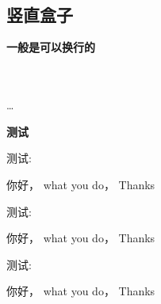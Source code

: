\documentclass[fontset=windows, 12pt]{article}
\begin{document}
\begin{example}
    \\
    \\
    \\
    \\
    \\
    \\


    \setlength{\fboxrule}{5mm}
    \\

    \setlength{\fboxsep}{10mm}  

\end{example}

\subsection{竖直盒子}
\textbf{一般是可以换行的}\par
\begin{command}
    \marg*{\ldots} \\[0.5ex]
     \\
    \ldots \\
\end{command}

\textbf{测试}\par
\begin{example}
测试:\parbox[b][2em][r]{3em}%
    {你好， what you do， Thanks}    
\end{example}


\vspace*{4em}
\begin{example}
测试:\parbox[b][2em][r]{3em}%
    {你好， what you do， Thanks}    
\end{example}

\vspace*{4em}
\begin{example}
测试:\parbox[t][2em][r]{4em}%
    {你好， what you do， Thanks}    
\end{example}
\end{document}
